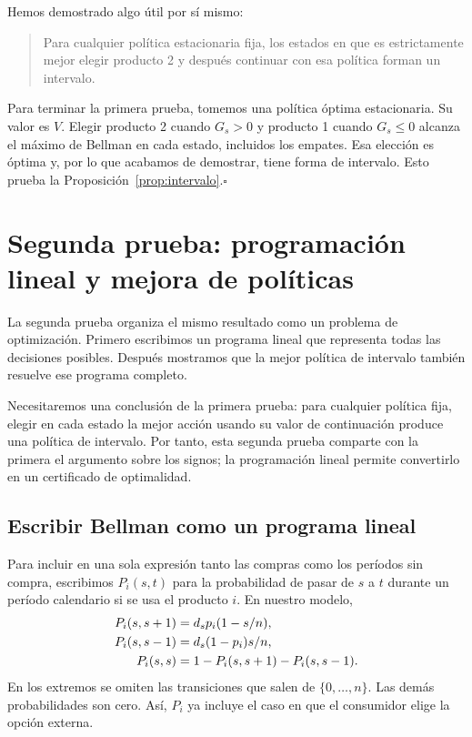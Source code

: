 \documentclass[11pt,a4paper]{article}
\begin{document}
Hemos demostrado algo útil por sí mismo:
\begin{quote}
Para cualquier política estacionaria fija, los estados en que es
estrictamente mejor elegir producto 2 y después continuar con esa
política forman un intervalo.
\end{quote}

Para terminar la primera prueba, tomemos una política óptima
estacionaria. Su valor es $V$. Elegir producto 2 cuando $G_s>0$ y
producto 1 cuando $G_s\le0$ alcanza el máximo de Bellman en cada
estado, incluidos los empates. Esa elección es óptima y, por lo que
acabamos de demostrar, tiene forma de intervalo. Esto prueba la
Proposición~\ref{prop:intervalo}.\hfill$\square$

\section{Segunda prueba: programación lineal y mejora de políticas}
\label{sec:lp}

La segunda prueba organiza el mismo resultado como un problema de
optimización. Primero escribimos un programa lineal que representa todas
las decisiones posibles. Después mostramos que la mejor política de
intervalo también resuelve ese programa completo.

Necesitaremos una conclusión de la primera prueba: para cualquier
política fija, elegir en cada estado la mejor acción usando su valor de
continuación produce una política de intervalo. Por tanto, esta segunda
prueba comparte con la primera el argumento sobre los signos; la
programación lineal permite convertirlo en un certificado de optimalidad.

\subsection{Escribir Bellman como un programa lineal}

Para incluir en una sola expresión tanto las compras como los períodos
sin compra, escribimos $P_i(s,t)$ para la probabilidad de pasar de $s$ a
$t$ durante un período calendario si se usa el producto $i$. En nuestro
modelo,
\begin{align}
P_i(s,s+1)&=d_s p_i(1-s/n),\notag\\
P_i(s,s-1)&=d_s(1-p_i)s/n,\label{eq:lp-transition}\\
P_i(s,s)&=1-P_i(s,s+1)-P_i(s,s-1).\notag
\end{align}
En los extremos se omiten las transiciones que salen de
$\{0,\ldots,n\}$. Las demás probabilidades son cero. Así, $P_i$
ya incluye el caso en que el consumidor elige la opción externa.
\end{document}
